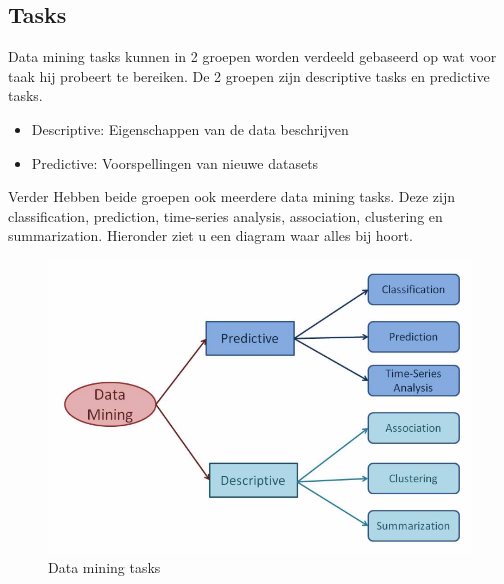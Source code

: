 \documentclass{article}
\begin{document}
\subsection{Tasks}

Data mining tasks kunnen in 2 groepen worden verdeeld gebaseerd op wat voor taak hij probeert te bereiken\cite{tasks}. De 2 groepen zijn descriptive tasks en predictive tasks.
\begin{itemize}
    \item Descriptive: Eigenschappen van de data beschrijven
    \item Predictive: Voorspellingen van nieuwe datasets
\end{itemize}
Verder Hebben beide groepen ook meerdere data mining tasks. Deze zijn classification, prediction, time-series analysis, association, clustering en summarization. Hieronder ziet u een diagram waar alles bij hoort.

\begin{figure}[h!]
  \centering
  \includegraphics[scale=0.3]{tasks.png}
  \caption{Data mining tasks}
\end{figure}

\newpage
\end{document}
